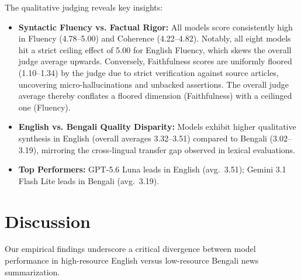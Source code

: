 \documentclass[runningheads]{llncs}
\begin{document}
The qualitative judging reveals key insights:
\begin{itemize}
    \item \textbf{Syntactic Fluency vs. Factual Rigor:} All models score consistently high in Fluency (4.78--5.00) and Coherence (4.22--4.82). Notably, all eight models hit a strict ceiling effect of 5.00 for English Fluency, which skews the overall judge average upwards. Conversely, Faithfulness scores are uniformly floored (1.10--1.34) by the judge due to strict verification against source articles, uncovering micro-hallucinations and unbacked assertions. The overall judge average thereby conflates a floored dimension (Faithfulness) with a ceilinged one (Fluency).
    \item \textbf{English vs. Bengali Quality Disparity:} Models exhibit higher qualitative synthesis in English (overall averages 3.32--3.51) compared to Bengali (3.02--3.19), mirroring the cross-lingual transfer gap observed in lexical evaluations.
    \item \textbf{Top Performers:} GPT-5.6 Luna leads in English (avg.\ 3.51); Gemini 3.1 Flash Lite leads in Bengali (avg.\ 3.19).
\end{itemize}

%
%
\section{Discussion}\label{sec:discussion}

Our empirical findings underscore a critical divergence between model performance in high-resource English versus low-resource Bengali news summarization.
\end{document}
